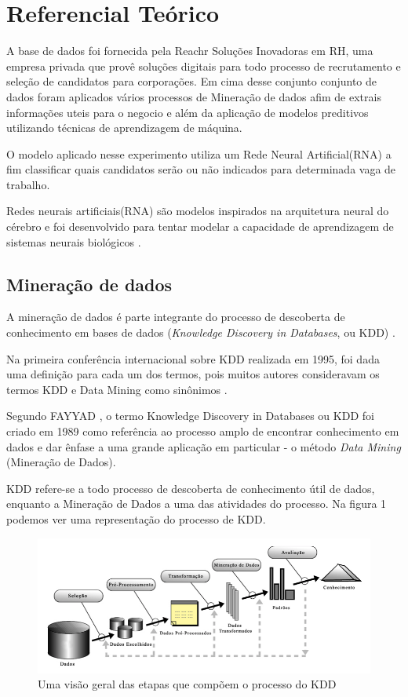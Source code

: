 \documentclass[conference]{IEEEtran}
\begin{document}
\section{Referencial Teórico}
	
    A base de dados foi fornecida pela Reachr Soluções Inovadoras em RH, uma empresa privada que provê soluções digitais para todo processo de recrutamento e seleção de candidatos para corporações. Em cima desse conjunto conjunto de dados foram aplicados vários processos de Mineração de dados afim de extrais informações uteis para o negocio e além da aplicação de modelos preditivos utilizando técnicas de aprendizagem de máquina.
    	
    O modelo aplicado nesse experimento utiliza um Rede Neural Artificial(RNA)  a fim classificar quais candidatos serão ou não indicados para determinada vaga de trabalho. 
    	
    Redes neurais artificiais(RNA) são modelos inspirados na arquitetura neural do cérebro e foi desenvolvido para tentar modelar a capacidade de aprendizagem de sistemas neurais biológicos \cite{b4}. 
	
	\subsection{Mineração de dados}
	
	A mineração de dados é parte integrante do processo de descoberta de conhecimento em bases de dados (\textit{Knowledge Discovery in Databases}, ou KDD) \cite{mineracao_nunes}.
	
	Na primeira  conferência internacional sobre KDD realizada em 1995, foi dada uma definição para cada um dos termos, pois muitos autores consideravam os termos KDD e Data Mining como sinônimos \cite{mineracao_nunes}. 
    
    Segundo FAYYAD \cite{kdd}, o termo Knowledge Discovery in Databases ou KDD foi criado em 1989 como referência ao processo amplo de encontrar conhecimento em dados e dar ênfase a uma grande aplicação em particular - o método \textit{Data Mining }(Mineração de Dados).
    
    KDD refere-se a todo processo de descoberta de conhecimento útil de dados, enquanto a Mineração de Dados a uma das atividades do processo. Na figura 1 podemos ver uma representação do processo de KDD.
   
	\begin{figure}[htbp]
	\centerline{\includegraphics[scale=0.3]{imagens/kdd.png}}
	\caption{Uma visão geral das etapas que compõem o processo do KDD}
	
	\label{fig}
	\end{figure}
\end{document}
